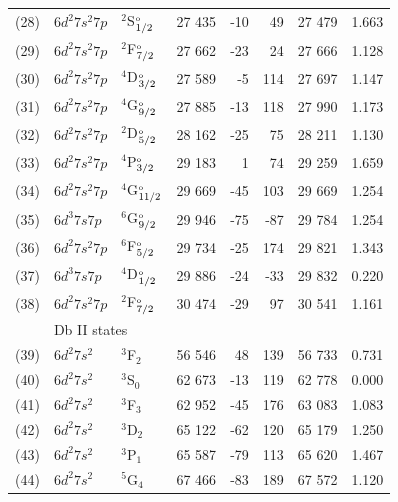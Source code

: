 \documentclass[10pt,a4paper, twoside, openright]{report}
\begin{document}
\begin{longtable}{cllrrrrr}
(28)   &  $6d^2 7s^2 7p$  &  $^2$S$^{\rm_o}_{1/2}$ &    27 435 & -10   &  49 & 27 479 & 1.663 \\ 
(29)  &   $6d^2 7s^2 7p$  &  $^2$F$^{\rm_o}_{7/2}$ &    27 662 & -23   & 24  & 27 666 & 1.128  \\ 
(30)  &  $6d^2 7s^2 7p$  &  $^4$D$^{\rm_o}_{3/2}$ &    27 589 & -5   & 114 & 27 697  & 1.147 \\ 
(31)  &  $6d^2 7s^2 7p$  &  $^4$G$^{\rm_o}_{9/2}$ &    27 885 & -13   &  118 & 27 990 & 1.173 \\ 
(32)   & $6d^2 7s^2 7p$  &  $^2$D$^{\rm_o}_{5/2}$ &    28 162 & -25  & 75 & 28 211  & 1.130 \\ 
(33)    &  $6d^2 7s^2 7p$  &  $^4$P$^{\rm_o}_{3/2}$ &    29 183 & 1  & 74 & 29 259 & 1.659 \\ 
(34)  & $6d^2 7s^2 7p$  &  $^4$G$^{\rm_o}_{11/2}$ &    29 669 & -45 & 103 & 29 669 & 1.254 \\ 
(35)  & $6d^3 7s 7p$  &  $^6$G$^{\rm_o}_{9/2}$ &    29 946 & -75  & -87 & 29 784 & 1.254 \\ 
(36)  &   $6d^2 7s^2 7p$  &  $^6$F$^{\rm_o}_{5/2}$   &  29 734 &  -25  & 174  & 29 821 & 1.343 \\ 
(37) &  $6d^3 7s 7p$  &  $^4$D$^{\rm_o}_{1/2}$  &  29 886 & -24  &  -33  & 29 832 & 0.220 \\ 
(38)  &  $6d^2 7s^2 7p$  &  $^2$F$^{\rm_o}_{7/2}$   &  30 474 & -29  & 97 & 30 541  & 1.161 \\ 
 & \multicolumn{5}{l}{Db II states} \\
(39)  &   $6d^2 7s^2$  &  $^3$F$_2$  & 56 546 & 48 & 139 & 56 733 & 0.731 \\ 
(40)  &   $6d^2 7s^2$  &  $^3$S$_0$  & 62 673 & -13 & 119 & 62 778 & 0.000 \\ 
(41)  &   $6d^2 7s^2$  &  $^3$F$_3$ & 62 952 & -45 & 176 & 63 083 & 1.083 \\ 
(42)  &   $6d^2 7s^2$  &  $^3$D$_2$  & 65 122 & -62 & 120 & 65 179 & 1.250 \\ 
(43)  &   $6d^2 7s^2$  &  $^3$P$_1$  & 65 587 & -79 & 113 & 65 620 & 1.467 \\ 
(44)  &   $6d^2 7s^2$  &  $^5$G$_4$  & 67 466 & -83 & 189 & 67 572 & 1.120 \\ 
\bottomrule 
 \bottomrule 
\end{longtable} 
\end{document}
